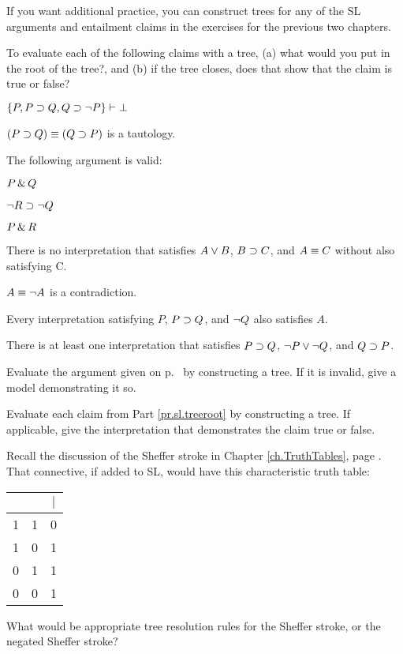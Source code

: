 \practiceproblems
If you want additional practice, you can construct trees for any of the SL arguments and entailment claims in the exercises for the previous two chapters.

\solutions
\problempart 
\label{pr.sl.treeroot}
To evaluate each of the following claims with a tree, (a) what would you put in the root of the tree?, and (b) if the tree closes, does that show that the claim is true or false?
\begin{earg}
\item $\{P, P \supset Q, Q \supset \neg P\} \vdash{}\bot$
\item $(P \supset Q) \equiv (Q \supset P)$ is a tautology.
\item The following argument is valid:
	\begin{ekey}
		\item[] $P \,\&\, Q$
		\item[] $\neg R \supset \neg Q$
		\item[\therefore] $P \,\&\, R$
	\end{ekey}
\item There is no interpretation that satisfies $A \vee B$, $B \supset C$, and $A \equiv C$ without also satisfying C.
\item $A \equiv \neg A$ is a contradiction.
\item Every interpretation satisfying $P$, $P \supset Q$, and $\neg Q$ also satisfies $A$.
\item There is at least one interpretation that satisfies $P \supset Q$, $\neg P \vee \neg Q$, and $Q \supset P$.
 \end{earg}

\solutions
\problempart 
\label{pr.sl.agtree}
Evaluate the argument given on p.\ \pageref{8letterargument} by constructing a tree. If it is invalid, give a model demonstrating it so.

\solutions
\problempart Evaluate each claim from Part \ref{pr.sl.treeroot} by constructing a tree. If applicable, give the interpretation that demonstrates the claim true or false.
\label{tree.examples}

\problempart Recall the discussion of the Sheffer stroke in Chapter \ref{ch.TruthTables}, page \pageref{pr.altConnectives}.  That connective, if added to SL, would have this characteristic truth table:

\begin{center}
\begin{tabular}{c|c|c}
\metaA{} & \metaB{} & \metaA{}$|$\metaB{}\\
\hline
1 & 1 & 0\\
1 & 0 & 1\\
0 & 1 & 1\\
0 & 0 & 1
\end{tabular}
\end{center}

What would be appropriate tree resolution rules for the Sheffer stroke, or the negated Sheffer stroke?
